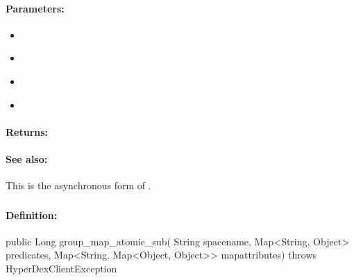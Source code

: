\paragraph{Parameters:}
\begin{itemize}[noitemsep]
\item {}\\

\item {}\\

\item {}\\

\item {}\\

\end{itemize}

\paragraph{Returns:}


\paragraph{See also:}  This is the asynchronous form of .

\pagebreak
\subsubsection{}
\label{api:java:group_map_atomic_sub}


\paragraph{Definition:}
\begin{javacode}
public Long group_map_atomic_sub(
        String spacename,
        Map<String, Object> predicates,
        Map<String, Map<Object, Object>> mapattributes) throws HyperDexClientException
\end{javacode}

